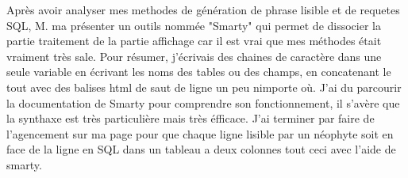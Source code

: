 Après avoir analyser mes methodes de génération de phrase lisible et de
requetes SQL, M. ma présenter un outils nommée "Smarty" qui permet de
dissocier la partie traitement de la partie affichage car il est vrai que mes
méthodes était vraiment très sale. Pour résumer, j'écrivais des chaines de
caractère dans une seule variable en écrivant les noms des tables ou des
champs, en concatenant le tout avec des balises html de saut de ligne un peu
nimporte où. J'ai du parcourir la documentation de Smarty pour comprendre son
fonctionnement, il s'avère que la synthaxe est très particulière mais très
éfficace. J'ai terminer par faire de l'agencement sur ma page pour que chaque
ligne lisible par un néophyte soit en face de la ligne en SQL dans un tableau a
deux colonnes tout ceci avec l'aide de smarty.

\clearpage
